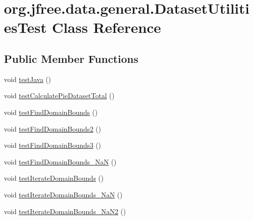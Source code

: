 \hypertarget{classorg_1_1jfree_1_1data_1_1general_1_1_dataset_utilities_test}{}\section{org.\+jfree.\+data.\+general.\+Dataset\+Utilities\+Test Class Reference}
\label{classorg_1_1jfree_1_1data_1_1general_1_1_dataset_utilities_test}
\subsection*{Public Member Functions}
\begin{DoxyCompactItemize}
\item 
void \mbox{\hyperlink{classorg_1_1jfree_1_1data_1_1general_1_1_dataset_utilities_test_ade4ffb2b2be167402b38d61b259e6f77}{test\+Java}} ()
\item 
void \mbox{\hyperlink{classorg_1_1jfree_1_1data_1_1general_1_1_dataset_utilities_test_a2bfda17342dab41da09baa0ac5ce7ebf}{test\+Calculate\+Pie\+Dataset\+Total}} ()
\item 
void \mbox{\hyperlink{classorg_1_1jfree_1_1data_1_1general_1_1_dataset_utilities_test_a59d99edbf9d618b445d1a3002026e44e}{test\+Find\+Domain\+Bounds}} ()
\item 
void \mbox{\hyperlink{classorg_1_1jfree_1_1data_1_1general_1_1_dataset_utilities_test_a020b2f7dc1506cb22d4f64cda37b1bd6}{test\+Find\+Domain\+Bounds2}} ()
\item 
void \mbox{\hyperlink{classorg_1_1jfree_1_1data_1_1general_1_1_dataset_utilities_test_ad48df04956b9cbaa9e8be7a7c912007c}{test\+Find\+Domain\+Bounds3}} ()
\item 
void \mbox{\hyperlink{classorg_1_1jfree_1_1data_1_1general_1_1_dataset_utilities_test_a9393e288cbc7b8b854c342d5c2f330b7}{test\+Find\+Domain\+Bounds\+\_\+\+NaN}} ()
\item 
void \mbox{\hyperlink{classorg_1_1jfree_1_1data_1_1general_1_1_dataset_utilities_test_a3fee85c2474d7e78464dcce485ecfbb6}{test\+Iterate\+Domain\+Bounds}} ()
\item 
void \mbox{\hyperlink{classorg_1_1jfree_1_1data_1_1general_1_1_dataset_utilities_test_a438100d61f669a62b03c764eefbe4a4c}{test\+Iterate\+Domain\+Bounds\+\_\+\+NaN}} ()
\item 
void \mbox{\hyperlink{classorg_1_1jfree_1_1data_1_1general_1_1_dataset_utilities_test_aff44b5e0c0b7e0e9b3861c8db6820e9f}{test\+Iterate\+Domain\+Bounds\+\_\+\+Na\+N2}} ()

\end{DoxyCompactItemize}

